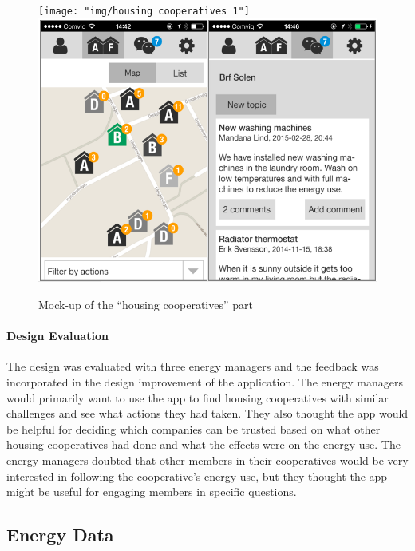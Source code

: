 \begin{figure}
\centering
\texttt{[image: "img/housing cooperatives 1"]}
\includegraphics[width=0.9\linewidth]{"img/housing cooperatives 2"}
\caption{Mock-up of the ``housing cooperatives'' part}
\label{fig:brf}
\end{figure}

\paragraph{Design Evaluation}

The design was evaluated with three energy managers and the feedback was incorporated in the design improvement of the application. The energy managers would primarily want to use the app to find housing cooperatives with similar challenges and see what actions they had taken. They also thought the app would be helpful for deciding which companies can be trusted based on what other housing cooperatives had done and what the effects were on the energy use. The energy managers doubted that other members in their cooperatives would be very interested in following the cooperative's energy use, but they thought the app might be useful for engaging members in specific questions. 

\subsection{Energy Data} 
\label{sect:load_shifting}

